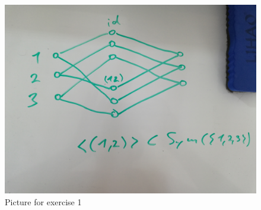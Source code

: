 \begin{figure}
\includegraphics[height=\textwidth, angle=90]{graph.jpg}
\caption{Picture for exercise 1}
\label{fig:1}
\end{figure}